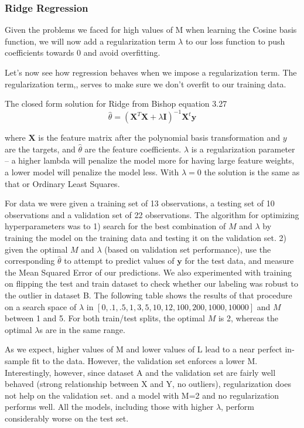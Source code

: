 \documentclass[10pt]{article}
\begin{document}
\subsubsection*{Ridge Regression}

Given the problems we faced for high values of M when learning the Cosine basis function, we will now add a regularization term  $\lambda$ to our loss function to push coefficients towards 0 and avoid overfitting. 

Let's now see how regression behaves when we impose a regularization term. The regularization term,, serves to make sure we don't overfit to our training data. 

The closed form solution for Ridge from Bishop equation 3.27
\begin{equation}
\hat{\theta} = (\mathbf{X}^T\mathbf{X} + \lambda \mathbf{I})^{-1}\mathbf{X}^t\mathbf{y}
\end{equation}

\noindent where $\mathbf{X}$ is the feature matrix after the polynomial basis transformation and  $y$ are the targets, and $\hat{\theta}$ are the feature coefficients. $\lambda$ is a regularization parameter --  a higher lambda will penalize the model more for having large feature weights, a lower model will penalize the model less. With $\lambda =0$ the solution is the same as that or Ordinary Least Squares.

For data we were given a training set of 13 observations, a testing set of 10 observations and a validation set of 22 observations. The algorithm for optimizing hyperparameters was to 1) search for the best combination of $M$ and $\lambda$ by training the model on the training data and testing it on the validation set. 2) given the optimal  $M$ and $\lambda$  (based on validation set performance), use the corresponding $\hat{\theta}$ to attempt to predict values of $\mathbf{y}$ for the test data, and measure the Mean Squared Error of our predictions. We also experimented with training on flipping the test and train dataset to check whether our labeling was robust to the outlier in dataset B. The following table shows the results of that procedure on a search space of  $\lambda$ in $[0, .1, .5, 1, 3,5,10, 12, 100, 200, 1000, 10000]$ and $M$  between 1 and 5. For both train/test splits, the optimal $M$ is 2, whereas the optimal $\lambda$s are in the same range. 

As we expect, higher values of M and lower values of L lead to a near perfect in-sample fit to the data. However, the validation set enforces a lower M. Interestingly, however, since dataset A and the validation set are fairly well behaved (strong relationship between X and Y, no outliers), regularization does not help on the validation set. and a model with M=2 and no regularization performs well. All the models, including those with higher $\lambda$, perform considerably worse on the test set.
\end{document}
